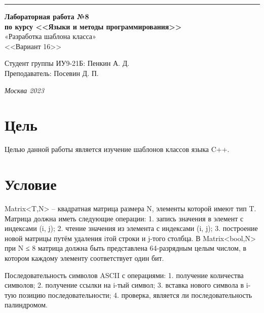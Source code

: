 ﻿\documentclass[a4paper, 12pt]{extarticle}
\begin{document}
\begin{titlepage}
\vspace*{-16pt}
\hspace{30pt}\rule{0.866\textwidth}{0.4pt}
  
\vspace{6em}

\begin{center}
\Large {\bf Лабораторная работа №8} \\ 
\large {\bf по курсу <<Языки и методы программирования>>} \\ 
\large «Разработка шаблона класса» \\
\large <<Вариант 16>>
\end{center}\normalsize

\vspace{15em}


\begin{flushright}
  {Студент группы ИУ9-21Б: Пенкин А. Д.\hspace*{15pt} \\
  \vspace{2ex}
  Преподаватель: Посевин Д. П.\hspace*{15pt}}
\end{flushright}

\bigskip

\vfill
 \vspace{7em}

\begin{center}
\textsl{Москва 2023}
\end{center}
\end{titlepage}

\renewcommand{\ttdefault}{pcr}

\setlength{\tabcolsep}{3pt}
\newpage
\setcounter{page}{2}

\section{Цель}\label{Sect::task}
\par
Целью данной работы является изучение шаблонов классов языка C++. 
\section{Условие}
\par
Matrix<T,N> – квадратная матрица размера N, элементы которой имеют тип T. Матрица должна иметь следующие операции:
1. запись значения в элемент с индексами (i, j);
2. чтение значения из элемента с индексами (i, j);
3. построение новой матрицы путём удаления iтой строки и j-того столбца. В Matrix<bool,N> при N ≤ 8 матрица должна быть представлена 64-разрядным целым числом, в котором каждому элементу соответствует один бит. 
\par
Последовательность символов ASCII с операциями:
1. получение количества символов;
2. получение ссылки на i-тый символ;
3. вставка нового символа в i-тую позицию
последовательности;
4. проверка, является ли последовательность
палиндромом. 
\end{document}
